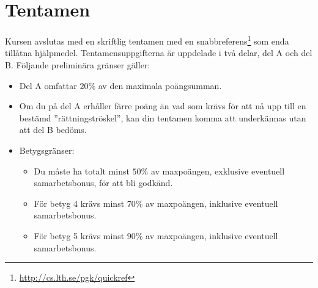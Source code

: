 \section{Tentamen}

Kursen avslutas med en skriftlig tentamen med en snabbreferens\footnote{\url{http://cs.lth.se/pgk/quickref}} som enda tillåtna hjälpmedel. Tentamensuppgifterna är uppdelade i två delar, del A och del B. Följande preliminära gränser gäller:

\begin{itemize}

\item Del A omfattar $20\%$ av den maximala poängsumman.
\item  Om du på del A erhåller färre poäng än vad som krävs för att nå upp till en bestämd ''rättningströskel'', kan din tentamen komma att underkännas utan att del B bedöms.
\item Betygsgränser:
\begin{itemize}
\item Du måste ha totalt minst $50\%$ av maxpoängen, exklusive eventuell samarbetsbonus, för att bli godkänd.
\item  För betyg 4 krävs minst $70\%$ av maxpoängen, inklusive eventuell samarbetsbonus.
\item  För betyg 5 krävs minst $90\%$ av maxpoängen, inklusive eventuell samarbetsbonus.
\end{itemize}
\end{itemize}